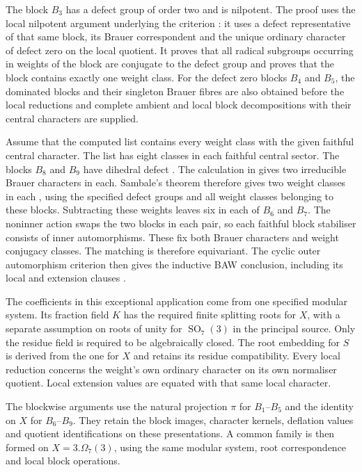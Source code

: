 The block $B_3$ has a defect group of order two and is nilpotent.
The proof uses the local nilpotent argument underlying the criterion
\cite[Theorem~1.3]{KoshitaniSpath2016}: it uses a defect representative
of that same block, its Brauer correspondent and the unique
ordinary character of defect zero on the local quotient. It proves
that all radical subgroups occurring in weights of the block are
conjugate to the defect group and
proves that the block contains exactly one weight class. For the defect zero blocks
$B_4$ and $B_5$, the dominated blocks and their singleton Brauer fibres
are also obtained before the local reductions and complete ambient and
local block decompositions with their central characters are supplied.

Assume that the computed list contains every weight class with the
given faithful central character. The list has eight classes in each
faithful central sector. The blocks $B_8$ and $B_9$ have dihedral defect
\cite[Section~5.5]{Macgregor2022}. The calculation in 
gives two irreducible Brauer characters in each. Sambale's theorem therefore gives
two weight classes in each \cite[Theorem~4.1]{Sambale2012},
using the specified defect groups and all weight classes belonging to these blocks. Subtracting
these weights leaves six in each of
$B_6$ and $B_7$. The noninner action swaps the two blocks in
each pair, so each faithful block stabiliser consists of inner
automorphisms. These fix both Brauer characters and weight conjugacy
classes. The matching is therefore equivariant. The cyclic outer
automorphism criterion then gives the inductive BAW conclusion,
including its local and extension clauses
\cite[Corollary~2.13]{FengLiZhang2019}.

The coefficients in this exceptional application come from one
specified modular system. Its fraction field $K$ has the required
finite splitting roots for $X$, with a separate assumption on roots of unity
for $\operatorname{SO}_7(3)$ in the principal source. Only the residue
field is required to be algebraically closed. The root embedding for $S$
is derived from the one for $X$ and retains its residue
compatibility. Every local reduction concerns the weight's own
ordinary character on its own normaliser quotient. Local extension
values are equated with that same local character.

The blockwise arguments use the natural projection $\pi$ for
$B_1$--$B_5$ and the identity on $X$ for $B_6$--$B_9$.
They retain the block images, character kernels, deflation values and
quotient identifications on these presentations. A common family is
then formed on $X=3.\Omega_7(3)$, using the same modular system,
root correspondence and local block operations.

